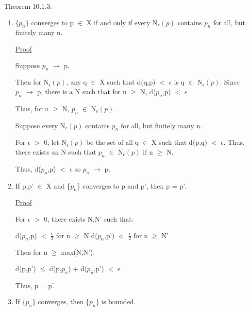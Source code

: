 { \color{red} Theorem 10.1.3: }

    \begin{enumerate}[label=(\alph*), leftmargin=2cm, itemsep=0.4em]
        \item \{$p_n$\} converges to p $\in$ X if and only if
        every N$_r(p)$ contains $p_n$ for all, but finitely many n.

            { \color{magenta} \underline{Proof} }

                Suppose $p_n$ $\rightarrow$ p.

                Then for N$_{\epsilon}(p)$, any q $\in$ X such that
                d(q,p) $<$ $\epsilon$ is q $\in$ N$_{\epsilon}(p)$.
                Since $p_n$ $\rightarrow$ p, there is a N such that for
                n $\geq$ N, d($p_n$,p) $<$ $\epsilon$.

                Thus, for n $\geq$ N, $p_n$ $\in$ N$_{\epsilon}(p)$.

                Suppose every N$_r(p)$ contains $p_n$ for all, but finitely
                many n.

                For $\epsilon$ $>$ 0, let N$_{\epsilon}(p)$ be the set of
                all q $\in$ X such that d(p,q) $<$ $\epsilon$.
                Thus, there exists an N such that $p_n$ $\in$ N$_{\epsilon}(p)$
                if n $\geq$ N.
                
                Thus, d($p_n$,p) $<$ $\epsilon$ so $p_n$ $\rightarrow$ p.


        \item If p,p' $\in$ X and \{$p_n$\} converges to p and p', then
        p = p'.

            { \color{magenta} \underline{Proof} }

                For $\epsilon$ $>$ 0, there exists N,N' such that:

                \hspace{1cm}
                d($p_n$,p) $<$ $\frac{\epsilon}{2}$ for n $\geq$ N
                \hspace{1cm}
                d($p_n$,p') $<$ $\frac{\epsilon}{2}$ for n $\geq$ N'

                Then for n $\geq$ max(N,N'):

                \hspace{1cm}
                d(p,p') $\leq$ d(p,$p_n$) + d($p_n$,p') $<$ $\epsilon$

                Thus, p = p'.

        \item If \{$p_n$\} converges, then \{$p_n$\} is bounded.


\end{enumerate}
